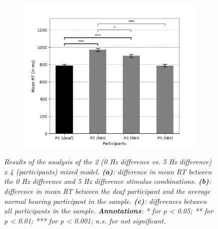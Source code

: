 \documentclass[12pt]{article}
\begin{document}
\begin{figure}[t!]
  \centering
  \begin{subfigure}[h]{0.5\textwidth}
    \includegraphics[width=\textwidth]{0Hz_5Hz_all_bars.png}
    \caption{}
    \label{fig:1c}
  \end{subfigure}
\caption{\textit{\footnotesize{Results of the analysis of the 2 (0 Hz difference vs.  5 Hz difference) x 4 (participants) mixed
model. \textbf{(a)}: difference in mean RT between the 0 Hz difference and 5 Hz difference stimulus combinations. \textbf{(b)}: difference in mean RT between the deaf participant and the average normal hearing participant in the sample. \textbf{(c)}: differences between all participants in the sample. \textbf{Annotations}: * for \textit{p} < 0.05; ** for \textit{p} < 0.01; *** for \textit{p} < 0.001; \textit{n.s.} for not significant.}}}
\end{figure}
%
\end{document}
